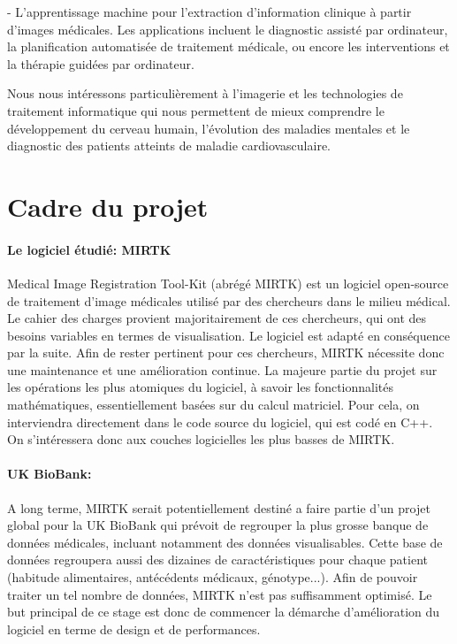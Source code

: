 \documentclass[10pt]{report}
\begin{document}
	- L'apprentissage machine pour l'extraction d'information clinique à partir
	d'images médicales. Les applications incluent le diagnostic assisté par
	ordinateur, la planification automatisée de traitement médicale, ou encore les
	interventions et la thérapie guidées par ordinateur.

	Nous nous intéressons particulièrement à l'imagerie et les technologies de
	traitement informatique qui nous permettent de mieux comprendre le
	développement du cerveau humain, l’évolution des maladies mentales et le
	diagnostic des patients atteints de maladie cardiovasculaire.
	
	
	\section{Cadre du projet} %
	\paragraph{Le logiciel étudié: MIRTK}
	Medical Image Registration Tool-Kit (abrégé MIRTK) est un logiciel open-source de traitement d'image médicales utilisé par des chercheurs dans le milieu médical. Le cahier des charges provient majoritairement de ces chercheurs, qui ont des besoins variables en termes de visualisation. Le logiciel est adapté en conséquence par la suite.
	Afin de rester pertinent pour ces chercheurs, MIRTK nécessite donc une maintenance et une amélioration continue. 
	 La majeure partie du projet sur les opérations les plus atomiques du logiciel, à savoir les fonctionnalités mathématiques, essentiellement basées sur du calcul matriciel. Pour cela, on interviendra directement dans le code source du logiciel, qui est codé en C++. On s'intéressera donc aux couches logicielles les plus basses de MIRTK.
	 \paragraph{UK BioBank:} 
	  A long terme, MIRTK serait potentiellement destiné a faire partie d'un projet global pour la UK BioBank qui prévoit de regrouper la plus grosse banque de données médicales, incluant notamment des données visualisables. Cette base de données regroupera aussi des dizaines de caractéristiques pour chaque patient (habitude alimentaires, antécédents médicaux, génotype...). Afin de pouvoir traiter un tel nombre de données, MIRTK n'est pas suffisamment optimisé. Le but principal de ce stage est donc de commencer la démarche d'amélioration du logiciel en terme de design et de performances.
	 
\end{document}
